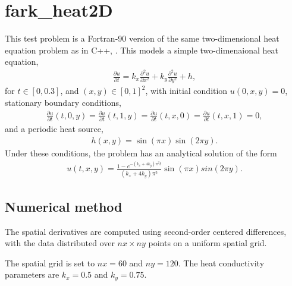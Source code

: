 \documentclass[letterpaper,10pt,english]{sphinxmanual}
\begin{document}
\section{fark\_heat2D}
\label{\detokenize{f90_parallel:id1}}\label{\detokenize{f90_parallel:fark-heat2d}}
This test problem is a Fortran-90 version of the same two-dimensional
heat equation problem as in C++, {\hyperref[\detokenize{cpp_parallel:ark-heat2d}]{}}.  This models a
simple two-dimenaional heat equation,
\begin{equation*}
\begin{split}\frac{\partial u}{\partial t} = k_x \frac{\partial^2 u}{\partial x^2}
                              + k_y \frac{\partial^2 u}{\partial y^2} + h,\end{split}
\end{equation*}
for \(t \in [0, 0.3]\), and \((x,y) \in [0, 1]^2\), with initial
condition \(u(0,x,y) = 0\), stationary boundary conditions,
\begin{equation*}
\begin{split}\frac{\partial u}{\partial t}(t,0,y) = \frac{\partial u}{\partial t}(t,1,y) =
\frac{\partial u}{\partial t}(t,x,0) = \frac{\partial u}{\partial t}(t,x,1) = 0,\end{split}
\end{equation*}
and a periodic heat source,
\begin{equation*}
\begin{split}h(x,y) = \sin(\pi x) \sin(2\pi y).\end{split}
\end{equation*}
Under these conditions, the problem has an analytical solution of the
form
\begin{equation*}
\begin{split}u(t,x,y) = \frac{1 - e^{-(k_x+4k_y)\pi^2 t}}{(k_x+4k_y)\pi^2} \sin(\pi x) sin(2\pi y).\end{split}
\end{equation*}

\subsection{Numerical method}
\label{\detokenize{f90_parallel:numerical-method}}
The spatial derivatives are computed using second-order centered
differences, with the data distributed over \(nx\times ny\) points
on a uniform spatial grid.

The spatial grid is set to \(nx=60\) and \(ny=120\).  The heat
conductivity parameters are \(k_x=0.5\) and \(k_y=0.75\).
\end{document}

